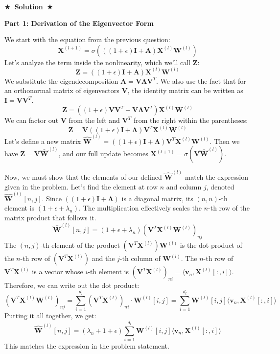 \documentclass{article}
\numberwithin{figure}{section}
\newcommand{\Solution}[1]{%
    {%
        \medskip
        \color{red}
        \bf $\bigstar$~\sf\textbf{Solution}~$\bigstar$ \sf
        #1
    }
    \bigskip
}
\begin{document}
\Solution{
	\textbf{Part 1: Derivation of the Eigenvector Form}
	
	We start with the equation from the previous question:
	\[ \mathbf{X}^{(l+1)} = \sigma\left( \left( (1+\epsilon)\mathbf{I} + \mathbf{A}\right) \mathbf{X}^{(l)} \mathbf{W}^{(l)} \right) \]
	Let's analyze the term inside the nonlinearity, which we'll call $\mathbf{Z}$:
	\[ \mathbf{Z} = \left( (1+\epsilon)\mathbf{I} + \mathbf{A}\right) \mathbf{X}^{(l)} \mathbf{W}^{(l)} \]
	We substitute the eigendecomposition $\mathbf{A}=\mathbf{V}\mathbf{\Lambda}\mathbf{V}^T$. We also use the fact that for an orthonormal matrix of eigenvectors $\mathbf{V}$, the identity matrix can be written as $\mathbf{I} = \mathbf{V}\mathbf{V}^T$.
	\[ \mathbf{Z} = \left( (1+\epsilon)\mathbf{V}\mathbf{V}^T + \mathbf{V}\mathbf{\Lambda}\mathbf{V}^T\right) \mathbf{X}^{(l)} \mathbf{W}^{(l)} \]
	We can factor out $\mathbf{V}$ from the left and $\mathbf{V}^T$ from the right within the parentheses:
	\[ \mathbf{Z} = \mathbf{V} \left( (1+\epsilon)\mathbf{I} + \mathbf{\Lambda}\right) \mathbf{V}^T \mathbf{X}^{(l)} \mathbf{W}^{(l)} \]
	Let's define a new matrix $\hat{\mathbf{W}}^{(l)} = \left( (1+\epsilon)\mathbf{I} + \mathbf{\Lambda}\right) \mathbf{V}^T \mathbf{X}^{(l)} \mathbf{W}^{(l)}$. Then we have $\mathbf{Z} = \mathbf{V} \hat{\mathbf{W}}^{(l)}$, and our full update becomes $\mathbf{X}^{(l+1)} = \sigma(\mathbf{V}\hat{\mathbf{W}}^{(l)})$.
	
	Now, we must show that the elements of our defined $\hat{\mathbf{W}}^{(l)}$ match the expression given in the problem. Let's find the element at row $n$ and column $j$, denoted $\hat{\mathbf{W}}^{(l)}[n, j]$.
	Since $((1+\epsilon)\mathbf{I} + \mathbf{\Lambda})$ is a diagonal matrix, its $(n,n)$-th element is $(1+\epsilon+\lambda_n)$. The multiplication effectively scales the $n$-th row of the matrix product that follows it.
	\[ \hat{\mathbf{W}}^{(l)}[n, j] = (1+\epsilon+\lambda_n) \left( \mathbf{V}^T \mathbf{X}^{(l)} \mathbf{W}^{(l)} \right)_{nj} \]
	The $(n,j)$-th element of the product $(\mathbf{V}^T \mathbf{X}^{(l)}) \mathbf{W}^{(l)}$ is the dot product of the $n$-th row of $(\mathbf{V}^T \mathbf{X}^{(l)})$ and the $j$-th column of $\mathbf{W}^{(l)}$.
	The $n$-th row of $\mathbf{V}^T \mathbf{X}^{(l)}$ is a vector whose $i$-th element is $(\mathbf{V}^T \mathbf{X}^{(l)})_{ni} = \langle\mathbf{v}_n, \mathbf{X}^{(l)}[:,i]\rangle$.
	Therefore, we can write out the dot product:
	\[ \left( \mathbf{V}^T \mathbf{X}^{(l)} \mathbf{W}^{(l)} \right)_{nj} = \sum_{i=1}^{d_l} (\mathbf{V}^T \mathbf{X}^{(l)})_{ni} \cdot \mathbf{W}^{(l)}[i,j] = \sum_{i=1}^{d_l} \mathbf{W}^{(l)}[i,j] \langle\mathbf{v}_n, \mathbf{X}^{(l)}[:,i]\rangle \]
	Putting it all together, we get:
	\[ \hat{\mathbf{W}}^{(l)}[n, j] = \left(\lambda_n+1+\epsilon\right) \sum_{i=1}^{d_l}\mathbf{W}^{(l)}[i,j]\langle\mathbf{v}_n,\mathbf{X}^{(l)}\left[:,i\right]\rangle \]
	This matches the expression in the problem statement.
	
}
\end{document}
